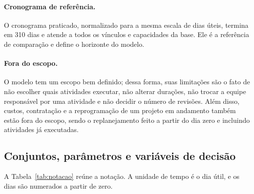 \paragraph{Cronograma de referência.}
O cronograma praticado, normalizado para a mesma escala de dias úteis,
termina em 310 dias e atende a todos os vínculos e capacidades da base.
Ele é a referência de comparação e define o horizonte do modelo.

\paragraph{Fora do escopo.}
O modelo tem um escopo bem definido; dessa forma, suas limitações são o fato de não escolher quais atividades executar, não alterar durações, não
trocar a equipe responsável por uma atividade e não decidir o número de
revisões. Além disso, custos, contratação e a reprogramação de um projeto em
andamento também estão fora do escopo, sendo o replanejamento feito a partir do dia zero e
incluindo atividades já executadas.

\subsection{Conjuntos, parâmetros e variáveis de decisão}
\label{sec:notacao}

A Tabela~\ref{tab:notacao} reúne a notação. A unidade de tempo é o dia
útil, e os dias são numerados a partir de zero.

